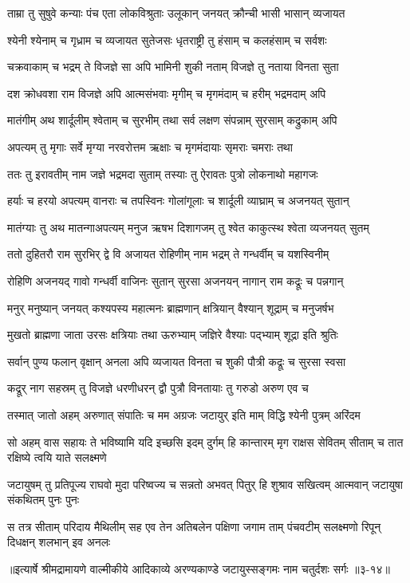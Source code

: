 \twolineshloka
{ताम्रा तु सुषुवे कन्याः पंच एता लोकविश्रुताः}
{उलूकान् जनयत् क्रौन्ची भासी भासान् व्यजायत} %

\twolineshloka
{श्येनी श्येनाम् च गृध्राम च व्यजायत सुतेजसः}
{धृतराष्ट्री तु हंसाम् च कलहंसाम् च सर्वशः} %

\twolineshloka
{चक्रवाकाम् च भद्रम् ते विजज्ञे सा अपि भामिनी}
{शुकी नताम् विजज्ञे तु नताया विनता सुता} %

\twolineshloka
{दश क्रोधवशा राम विजज्ञे अपि आत्मसंभवाः}
{मृगीम् च मृगमंदाम् च हरीम् भद्रमदाम् अपि} %

\twolineshloka
{मातंगीम् अथ शार्दूलीम् श्वेताम् च सुरभीम् तथा}
{सर्व लक्षण संपन्नाम् सुरसाम् कद्रुकाम् अपि} %

\twolineshloka
{अपत्यम् तु मृगाः सर्वे मृग्या नरवरोत्तम}
{ऋक्षाः च मृगमंदायाः सृमराः चमराः तथा} %

\twolineshloka
{ततः तु इरावतीम् नाम जज्ञे भद्रमदा सुताम्}
{तस्याः तु ऐरावतः पुत्रो लोकनाथो महागजः} %

\twolineshloka
{हर्याः च हरयो अपत्यम् वानराः च तपस्विनः}
{गोलांगूलाः च शार्दूली व्याघ्राम् च अजनयत् सुतान्} %

\twolineshloka
{मातंग्याः तु अथ मातन्गाअपत्यम् मनुज ऋषभ}
{दिशागजम् तु श्वेत काकुत्स्थ श्वेता व्यजनयत् सुतम्} %

\twolineshloka
{ततो दुहितरौ राम सुरभिर् द्वे वि अजायत}
{रोहिणीम् नाम भद्रम् ते गन्धर्वीम् च यशस्विनीम्} %

\twolineshloka
{रोहिणि अजनयद् गावो गन्धर्वी वाजिनः सुतान्}
{सुरसा अजनयन् नागान् राम कद्रूः च पन्नगान्} %

\twolineshloka
{मनुर् मनुष्यान् जनयत् कश्यपस्य महात्मनः}
{ब्राह्मणान् क्षत्रियान् वैश्यान् शूद्राम् च मनुजर्षभ} %

\twolineshloka
{मुखतो ब्राह्मणा जाता उरसः क्षत्रियाः तथा}
{ऊरुभ्याम् जज्ञिरे वैश्याः पद्भ्याम् शूद्रा इति श्रुतिः} %

\twolineshloka
{सर्वान् पुण्य फलान् वृक्षान् अनला अपि व्यजायत}
{विनता च शुकी पौत्री कद्रूः च सुरसा स्वसा} %

\twolineshloka
{कद्रूर् नाग सहस्रम् तु विजज्ञे धरणीधरन्}
{द्वौ पुत्रौ विनतायाः तु गरुडो अरुण एव च} %

\twolineshloka
{तस्मात् जातो अहम् अरुणात् संपातिः च मम अग्रजः}
{जटायुर् इति माम् विद्धि श्येनी पुत्रम् अरिंदम} %

\twolineshloka
{सो अहम् वास सहायः ते भविष्यामि यदि इच्छसि}
{इदम् दुर्गम् हि कान्तारम् मृग राक्षस सेवितम् सीताम् च तात रक्षिष्ये त्वयि याते सलक्ष्मणे} %

\twolineshloka
{जटायुषम् तु प्रतिपूज्य राघवो मुदा परिष्वज्य च सन्नतो अभवत्}
{पितुर् हि शुश्राव सखित्वम् आत्मवान् जटायुषा संकथितम् पुनः पुनः} %

\twolineshloka
{स तत्र सीताम् परिदाय मैथिलीम् सह एव तेन अतिबलेन पक्षिणा}
{जगाम ताम् पंचवटीम् सलक्ष्मणो रिपून् दिधक्षन् शलभान् इव अनलः} %


॥इत्यार्षे श्रीमद्रामायणे वाल्मीकीये आदिकाव्ये अरण्यकाण्डे जटायुस्सङ्गमः नाम चतुर्दशः सर्गः ॥३-१४॥
